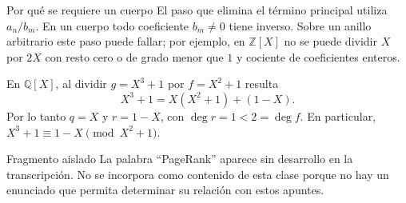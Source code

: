 \begin{nota}{Por qué se requiere un cuerpo}
El paso que elimina el término principal utiliza $a_n/b_m$.
En un cuerpo todo coeficiente $b_m\neq0$ tiene inverso.
Sobre un anillo arbitrario este paso puede fallar; por ejemplo, en
$\mathbb Z[X]$ no se puede dividir $X$ por $2X$ con resto cero
o de grado menor que $1$ y cociente de coeficientes enteros.
\end{nota}
\begin{ejemplo}
En $\mathbb Q[X]$, al dividir $g=X^3+1$ por $f=X^2+1$ resulta
\[
X^3+1=X(X^2+1)+(1-X).
\]
Por lo tanto $q=X$ y $r=1-X$, con $\deg r=1<2=\deg f$.
En particular, $X^3+1\equiv1-X\pmod{X^2+1}$.
\end{ejemplo}
\begin{nota}{Fragmento aislado}
La palabra ``PageRank'' aparece sin desarrollo en la transcripción.
No se incorpora como contenido de esta clase porque no hay un
enunciado que permita determinar su relación con estos apuntes.
\end{nota}
